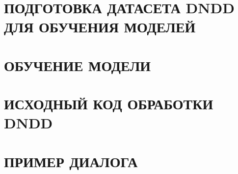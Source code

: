 \documentclass{disser}
\begin{document}

\tableofcontents %
\thispagestyle{empty}


\chapter{ПОДГОТОВКА ДАТАСЕТА DNDD ДЛЯ ОБУЧЕНИЯ МОДЕЛЕЙ}


\chapter{ОБУЧЕНИЕ МОДЕЛИ}



\break



\appendix
\renewcommand{\thechapter}{\Asbuk{chapter}}
\chapter{ИСХОДНЫЙ КОД ОБРАБОТКИ DNDD}
\label{app:code}
\chapter{ПРИМЕР ДИАЛОГА}
\label{app:diagogue}
\end{document}
